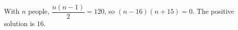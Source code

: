 With $ n $ people, $\dfrac{n(n-1)}{2}=120 $, so $(n-16)(n+15)=0 $. The positive solution is $\boxed{16}$.
